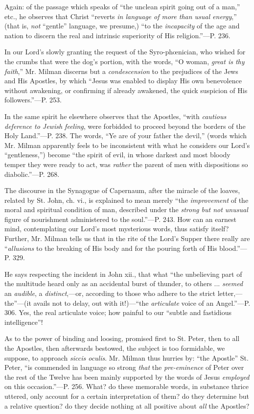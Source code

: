 Again: of the passage which speaks of ``the
unclean spirit going out of a man,'' etc., he observes that
Christ ``reverts \emph{in language of more than usual energy},'' (that
is, \emph{not} ``gentle'' language, we presume,) ``to the \emph{incapacity}
of the age and nation to discern the real and intrinsic superiority of
His religion.''—P. 236.

In our Lord's slowly granting the request of the
Syro-phœnician, who wished for the crumbs that were the dog's
portion, with the words, ``O woman, \emph{great is thy faith},'' Mr.
Milman discerns but a \emph{condescension} to the prejudices of the
Jews and His Apostles, by which ``Jesus was enabled to display His own
benevolence without awakening, or confirming if already awakened, the
quick suspicion of His followers.''—P. 253.

In the same spirit he elsewhere observes that the
Apostles, ``with \emph{cautious deference to Jewish feeling}, were
forbidded to proceed beyond the borders of the Holy Land.''—P. 238.
The words, ``Ye are of your father the devil,'' (words which Mr. Milman
apparently feels to be inconsistent with what he considers our Lord's ``gentleness,'')
become ``the spirit of evil, in whose darkest and most bloody temper
they were ready to act, was \emph{rather} the parent of men with
dispositions so diabolic.''—P. 268.

The discourse in the Synagogue of Capernaum,
after the miracle of the loaves, related by St. John, ch. vi., is
explained to mean merely ``the \emph{improvement} of the moral and
spiritual condition of man, described under the \emph{strong but not
unusual} figure of nourishment administered to the soul.''—P. 243.
How can an earnest mind, contemplating our Lord's most mysterious
words, thus satisfy itself? Further, Mr. Milman tells us that in the
rite of the Lord's Supper there really are ``\emph{allusions} to the
breaking of His body and for the pouring forth of His blood.''—P.
329.

He says respecting the incident in John xii.,
that what ``the unbelieving part of the multitude heard only as an
accidental burst of thunder, to others ... \emph{seemed} an \emph{audible},
a \emph{distinct},—or, according to those who adhere to the strict
letter,—the''—(it avails not to delay, out with it!)—``the \emph{articulate}
voice of an Angel.''—P. 306. Yes, the real articulate voice; how
painful to our ``subtle and fastidious intelligence''!

As to the power of binding and loosing, promised
first to St. Peter, then to all the Apostles, then afterwards
bestowed, the subject is too formidable, we suppose, to approach \emph{siccis
oculis}. Mr. Milman thus hurries by: ``the Apostle'' St. Peter, ``is
commended in language so strong \emph{that} the \emph{pre-eminence} of
Peter over the rest of the Twelve has been mainly supported by the
words of Jesus \emph{employed} on this occasion.''—P. 256. What? do
these memorable words, in substance thrice uttered, only account for a
certain interpretation of them? do they determine but a relative
question? do they decide nothing at all positive about \emph{all} the
Apostles?

